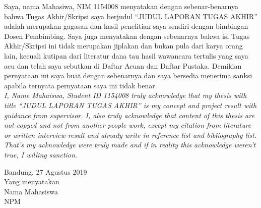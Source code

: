 \sloppy

\begin{halaman}
\thispagestyle{plain}

Saya, nama Mahasiwa, NIM 1154008 menyatakan dengan sebenar-benarnya bahwa Tugas Akhir/Skripsi saya berjudul ``JUDUL LAPORAN TUGAS AKHIR'' adalah merupakan gagasan dan hasil penelitian saya sendiri dengan bimbingan Dosen Pembimbing.
Saya juga menyatakan dengan sebenarnya bahwa isi Tugas Akhir/Skripsi ini tidak merupakan jiplakan dan bukan pula dari karya orang lain, kecuali kutipan dari literatur dana tau hasil wawancara tertulis yang saya acu dan telah saya sebutkan di Daftar Acuan dan Daftar Pustaka.
Demikian pernyataan ini saya buat dengan sebenarnya dan saya bersedia menerima sanksi apabila ternyata pernyataan saya ini tidak benar. \\[2ex]
\textit{I, Name Mahaiswa, Student ID 1154008 truly acknowledge that my thesis with title ``JUDUL LAPORAN TUGAS AKHIR'' is my concept and project result with guidance from supervisor.
I, also truly acknowledge that content of this thesis are not copyed and not from another people work, except my citation from literature or written interview result and already write in reference list and bibliography list. 
That’s my acknowledge were truly made and if in reality this acknowledge weren’t true, I willing sanction.}
\begin{flushright}
Bandung, 27 Agustus 2019\\
Yang menyatakan \\[11ex]

Nama Mahasiswa \\
NPM
\end{flushright}

\end{halaman}